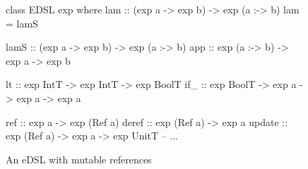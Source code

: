 \begin{figure}
\begin{code}
class EDSL exp where
     lam :: (exp a -> exp b) -> exp (a :-> b)
     lam = lamS

     lamS :: (exp a -> exp b) -> exp (a :-> b)
     app :: exp (a :-> b) -> exp a -> exp b

     lt :: exp IntT -> exp IntT -> exp BoolT
     if_ :: exp BoolT -> exp a -> exp a -> exp a

     ref :: exp a -> exp (Ref a)
     deref :: exp (Ref a) -> exp a
     update :: exp (Ref a) -> exp a -> exp UnitT
-- ...
\end{code}
\caption{An eDSL with mutable references}
\label{fig:edsl-mutref}
\end{figure}








